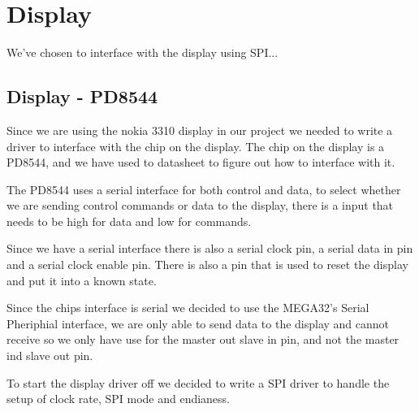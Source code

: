 \section{Display}

We've chosen to interface with the display using SPI...

\subsection{Display - PD8544}

Since we are using the nokia 3310 display in our project we needed to write a driver to interface with the chip on the display.
The chip on the display is a PD8544, and we have used to datasheet to figure out how to interface with it. 

The PD8544 uses a serial interface for both control and data, to select whether we are sending control commands or data to the display,
there is a input that needs to be high for data and low for commands.

Since we have a serial interface there is also a serial clock pin, a serial data in pin and a serial clock enable pin.
There is also a pin that is used to reset the display and put it into a known state.

Since the chips interface is serial we decided to use the MEGA32's Serial Pheriphial interface, we are only able to send data to the display 
and cannot receive so we only have use for the master out slave in pin, and not the master ind slave out pin. 

To start the display driver off we decided to write a SPI driver to handle the setup of clock rate, SPI mode and endianess.
